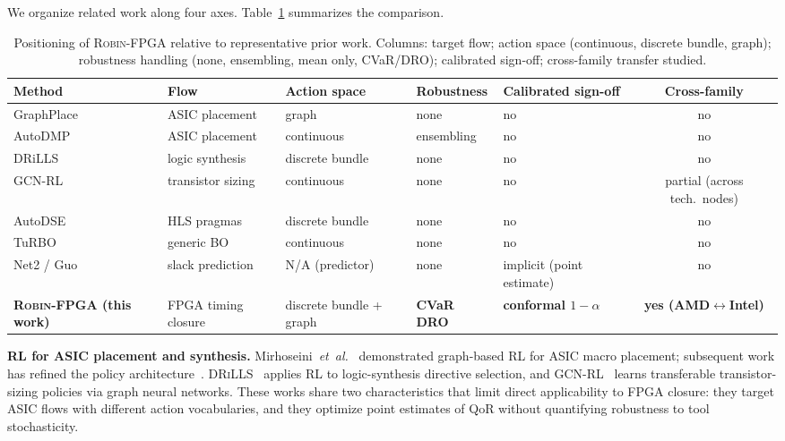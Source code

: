 \documentclass[journal,onecolumn=false]{IEEEtran}
\begin{document}
We organize related work along four axes. Table~\ref{tab:relwork} summarizes the comparison.

\begin{table}[t]
\caption{Positioning of \textsc{Robin-FPGA} relative to representative prior work. Columns: target flow; action space (continuous, discrete bundle, graph); robustness handling (none, ensembling, mean only, CVaR/DRO); calibrated sign-off; cross-family transfer studied.}
\label{tab:relwork}
\centering
\renewcommand{\arraystretch}{1.10}
\footnotesize
\begin{tabular}{@{}lllllc@{}}
\toprule
Method & Flow & Action space & Robustness & Calibrated sign-off & Cross-family \\
\midrule
GraphPlace~\cite{mirhoseini2021nature}      & ASIC placement   & graph     & none        & no & no \\
AutoDMP~\cite{agnesina2023autodmp}           & ASIC placement   & continuous & ensembling  & no & no \\
DRiLLS~\cite{hosny2020drills}                & logic synthesis  & discrete bundle & none   & no & no \\
GCN-RL~\cite{wang2020gcnrl}                  & transistor sizing & continuous & none      & no & partial (across tech.\ nodes) \\
AutoDSE~\cite{sohrabizadeh2022autodse}        & HLS pragmas      & discrete bundle & none   & no & no \\
TuRBO~\cite{eriksson2019turbo}                & generic BO       & continuous & none      & no & no \\
Net2 / Guo~\cite{barboza2019net2,guo2022timing} & slack prediction & N/A (predictor) & none & implicit (point estimate) & no \\
\textbf{\textsc{Robin-FPGA} (this work)}     & FPGA timing closure & discrete bundle + graph & \textbf{CVaR DRO} & \textbf{conformal $1{-}\alpha$} & \textbf{yes (AMD$\leftrightarrow$Intel)} \\
\bottomrule
\end{tabular}
\end{table}

\textbf{RL for ASIC placement and synthesis.} Mirhoseini~\emph{et~al.}\ \cite{mirhoseini2021nature} demonstrated graph-based RL for ASIC macro placement; subsequent work has refined the policy architecture~\cite{agnesina2023autodmp,cheng2021joint}. \textsc{DRiLLS}~\cite{hosny2020drills} applies RL to logic-synthesis directive selection, and \textsc{GCN-RL}~\cite{wang2020gcnrl} learns transferable transistor-sizing policies via graph neural networks. These works share two characteristics that limit direct applicability to FPGA closure: they target ASIC flows with different action vocabularies, and they optimize point estimates of QoR without quantifying robustness to tool stochasticity.
\end{document}
